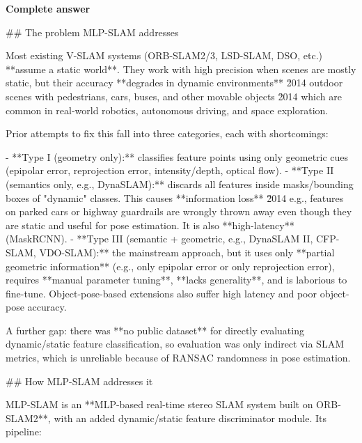 \documentclass[10pt]{article}
\begin{document}
\textbf{Complete answer}
\begin{AnswerText}
## The problem MLP-SLAM addresses

Most existing V-SLAM systems (ORB-SLAM2/3, LSD-SLAM, DSO, etc.) **assume a static world**. They work with high precision when scenes are mostly static, but their accuracy **degrades in dynamic environments** \u2014 outdoor scenes with pedestrians, cars, buses, and other movable objects \u2014 which are common in real-world robotics, autonomous driving, and space exploration.

Prior attempts to fix this fall into three categories, each with shortcomings:

- **Type I (geometry only):** classifies feature points using only geometric cues (epipolar error, reprojection error, intensity/depth, optical flow).
- **Type II (semantics only, e.g., DynaSLAM):** discards all features inside masks/bounding boxes of "dynamic" classes. This causes **information loss** \u2014 e.g., features on parked cars or highway guardrails are wrongly thrown away even though they are static and useful for pose estimation. It is also **high-latency** (MaskRCNN).
- **Type III (semantic + geometric, e.g., DynaSLAM II, CFP-SLAM, VDO-SLAM):** the mainstream approach, but it uses only **partial geometric information** (e.g., only epipolar error or only reprojection error), requires **manual parameter tuning**, **lacks generality**, and is laborious to fine-tune. Object-pose-based extensions also suffer high latency and poor object-pose accuracy.

A further gap: there was **no public dataset** for directly evaluating dynamic/static feature classification, so evaluation was only indirect via SLAM metrics, which is unreliable because of RANSAC randomness in pose estimation.

## How MLP-SLAM addresses it

MLP-SLAM is an **MLP-based real-time stereo SLAM system built on ORB-SLAM2**, with an added dynamic/static feature discriminator module. Its pipeline:


\end{AnswerText}
\end{document}
